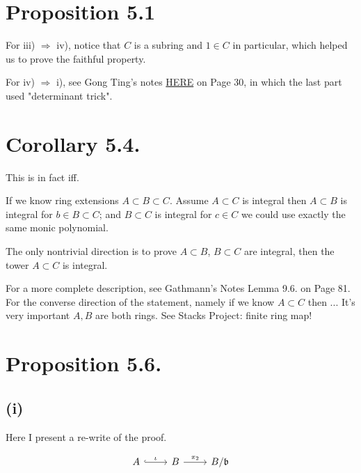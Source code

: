 
\section{Proposition 5.1}

For iii) $\Rightarrow$ iv), notice that $C$ is a subring and $1\in C$ in particular, which helped us to prove the faithful property.

For iv) $\Rightarrow$ i), see Gong Ting's notes \href{https://drive.google.com/file/d/12aM32lvgwaq9DI_ydv93aIty7Q1MhRmw/view}{HERE} on Page 30, in which the last part used "determinant trick".

\section{Corollary 5.4.}

This is in fact iff. 

If we know ring extensions $A\subset B\subset C$. Assume $A\subset C$ is integral then $A\subset B$ is integral for $b\in B\subset C$; and $B\subset C$ is integral for $c\in C$ we could use exactly the same monic polynomial. 

The only nontrivial direction is to prove $A\subset B$, $B\subset C$ are integral, then the tower $A\subset C$ is integral. 

For a more complete description, see Gathmann's Notes Lemma 9.6. on Page 81. For the converse direction of the statement, namely if we know $A\subset C$ then ... It's very important $A, B$ are both rings. See Stacks Project: finite ring map! 


\section{Proposition 5.6.}

\subsection{(i)}
Here I present a re-write of the proof. 

\[\begin{tikzcd}
	A & B & {B/\mathfrak b}
	\arrow["{\pi_2}", from=1-2, to=1-3]
	\arrow["\iota", hook, from=1-1, to=1-2]
\end{tikzcd}\]

